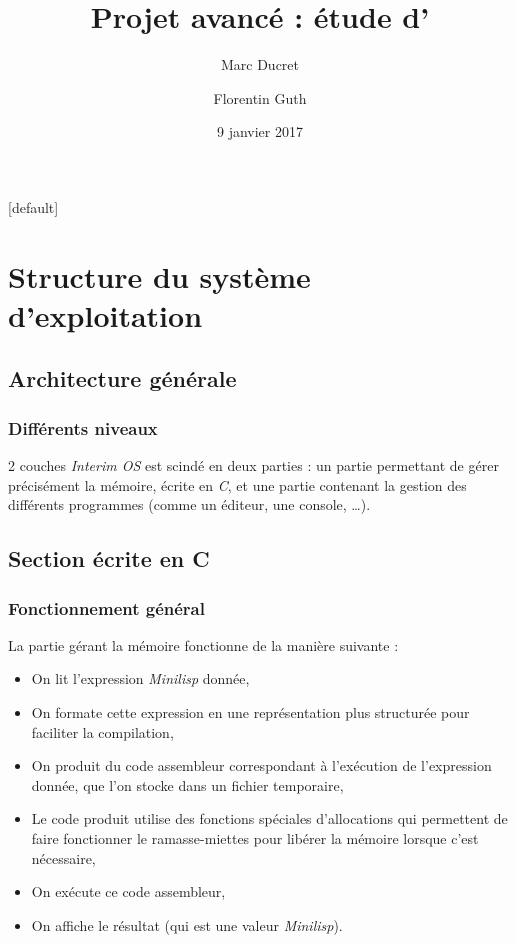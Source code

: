 \documentclass[c, 11pt, handout, xcolor=table]{beamer}
\title{Projet avancé : étude d'\foreign{Interim OS}}
\author{Marc Ducret \and Florentin Guth}
\date{9 janvier 2017}
\makeatletter
\newcommand{\foreign}[1]{\emph{#1}}
\newenvironment{withoutheadline}{
        \setbeamertemplate{headline}[default]
        \def\beamer@entrycode{\vspace*{-\headheight}}
    }{}
\makeatother
\begin{document}
\begin{withoutheadline}
 \begin{frame}
  \titlepage
  \tableofcontents
 \end{frame}
\end{withoutheadline}

\section{Structure du système d'exploitation}

\subsection{Architecture générale}

\begin{frame}
 \frametitle{Différents niveaux}
 
 \begin{block}{2 couches}
  \foreign{Interim OS} est scindé en deux parties : un partie permettant de gérer précisément la mémoire, écrite en \foreign{C}, et une partie contenant la gestion des différents programmes (comme un éditeur, une console, \ldots).
 \end{block}
\end{frame}


\subsection{Section écrite en C}

\begin{frame}
 \frametitle{Fonctionnement général}
 
 La partie gérant la mémoire fonctionne de la manière suivante :
 \begin{itemize}
  \item On lit l'expression \foreign{Minilisp} donnée,
  \item On formate cette expression en une représentation plus structurée pour faciliter la compilation,
  \item On produit du code assembleur correspondant à l'exécution de l'expression donnée, que l'on stocke dans un fichier temporaire,
  \item Le code produit utilise des fonctions spéciales d'allocations qui permettent de faire fonctionner le ramasse-miettes pour libérer la mémoire lorsque c'est nécessaire,
  \item On exécute ce code assembleur,
  \item On affiche le résultat (qui est une valeur \foreign{Minilisp}).
 \end{itemize}
\end{frame}
\end{document}
